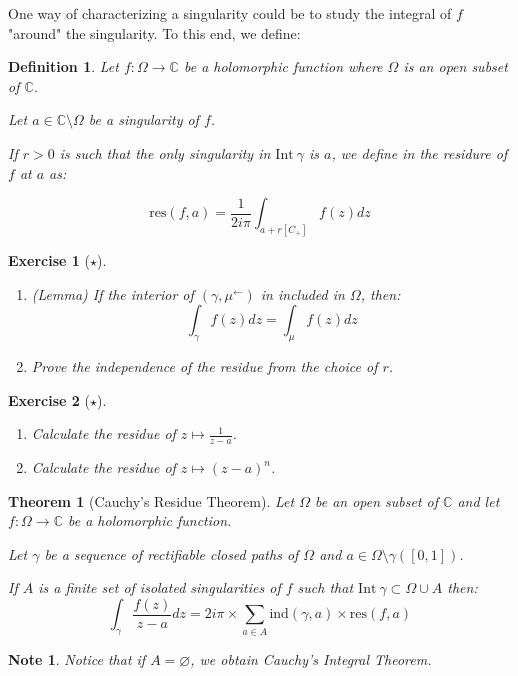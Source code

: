 \documentclass{article}
\newtheorem*{defi}{Definition}
\newtheorem*{note}{Note}
\newtheorem{exo}{Exercise}
\newtheorem*{thm*}{Theorem}
\let\emptyset\varnothing
\begin{document}
One way of characterizing a singularity could be to study the integral of $f$ "around" the singularity. To this end, we define:

\begin{defi}
    Let $f: \Omega \rightarrow \mathbb{C}$ be a holomorphic function where $\Omega$ is an open subset of $\mathbb{C}$.

    Let $a\in\mathbb{C}\setminus\Omega$ be a singularity of $f$.

    If $r>0$ is such that the only singularity in $\mathrm{Int}~\gamma$ is $a$, we define in the residure of $f$ at $a$ as:

    $$\mathrm{res}(f, a) = \frac{1}{2i\pi} \int_{a + r[C_+]} f(z)dz$$
\end{defi}

\begin{exo}[$\star$]
    \begin{enumerate}
        \item (Lemma) If the interior of $(\gamma, \mu^\leftarrow)$ in included in $\Omega$, then:
            $$\int_\gamma f(z)dz = \int_\mu f(z)dz$$
        \item Prove the independence of the residue from the choice of $r$.
    \end{enumerate}
\end{exo}

\begin{exo}[$\star$]
    \begin{enumerate}
        \item Calculate the residue of $z \mapsto \frac{1}{z-a}$.
        \item Calculate the residue of $z \mapsto (z-a)^n$.
    \end{enumerate}
\end{exo}

\begin{thm*}[Cauchy's Residue Theorem]
    Let $\Omega$ be an open subset of $\mathbb{C}$ and let $f: \Omega \rightarrow \mathbb{C}$ be a holomorphic function.

    Let $\gamma$ be a sequence of rectifiable closed paths of $\Omega$ and $a\in\Omega\setminus\gamma([0,1])$.

    If $A$ is a finite set of isolated singularities of $f$ such that $\mathrm{Int}~\gamma \subset \Omega \cup A$ then:
    $$\int_\gamma \frac{f(z)}{z-a}dz = 2i\pi \times \sum_{a\in A}\mathrm{ind}(\gamma, a) \times \mathrm{res}(f,a)$$
\end{thm*}

\begin{note}
    Notice that if $A = \emptyset$, we obtain Cauchy's Integral Theorem.
\end{note}
\end{document}
